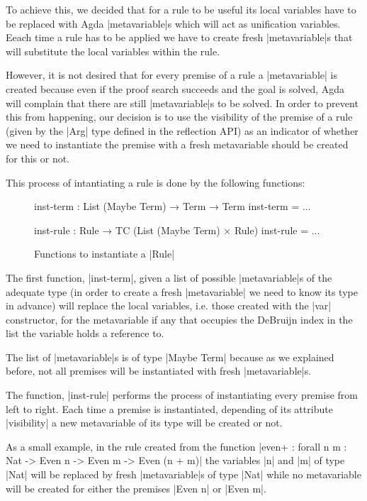 \documentclass[a4paper]{article}
\begin{document}
To achieve this, we decided that for a rule to be useful its local variables
have to be replaced with Agda |metavariable|s which will act as unification
variables. Eeach time a rule has to be applied we have to create fresh
|metavariable|s that will substitute the local variables within the rule.

However, it is not desired that for every premise of a rule a |metavariable| is
created because even if the proof search succeeds and the goal is solved, Agda
will complain that there are still |metavariable|s to be solved. In order to
prevent this from happening, our decision is to use the visibility of the
premise of a rule (given by the |Arg| type defined in the reflection API) as an
indicator of whether we need to instantiate the premise with a fresh
metavariable should be created for this or not.

This process of intantiating a rule is done by the following functions:

\begin{figure}
\small
\begin{code}
  inst-term : List (Maybe Term) → Term → Term
  inst-term = ...

  inst-rule : Rule → TC (List (Maybe Term) × Rule)
  inst-rule = ...
\end{code}
  \label{fig:inst}
  \caption{Functions to instantiate a |Rule|}
\end{figure}

The first function, |inst-term|, given a list of possible |metavariable|s of the
adequate type (in order to create a fresh |metavariable| we need to know its
type in advance) will replace the local variables, i.e. those created with the
|var| constructor, for the metavariable if any that occupies the DeBruijn index
in the list the variable holds a reference to.

The list of |metavariable|s is of type |Maybe Term| because as we explained
before, not all premises will be instantiated with fresh |metavariable|s.

The function, |inst-rule| performs the process of instantiating every premise
from left to right. Each time a premise is instantiated, depending of its
attribute |visibility| a new metavariable of its type will be created or not.

As a small example, in the rule created from the function |even+ : forall {n m : Nat} -> Even n -> Even m -> Even (n + m)| the variables |n| and |m| of type
|Nat| will be replaced by fresh |metavariable|s of type |Nat| while no
metavariable will be created for either the premises |Even n| or |Even m|.
\end{document}
